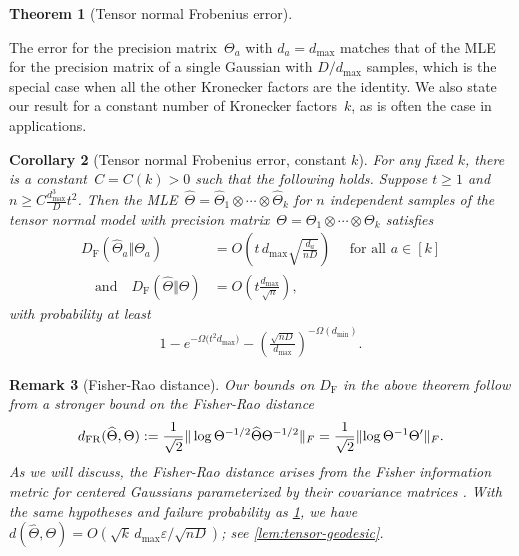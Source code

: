 \documentclass[aos]{imsart}
\newtheorem{theorem}{Theorem}[section]
\newtheorem{corollary}[theorem]{Corollary}
\newtheorem{remark*}[theorem]{Remark}
\theoremstyle{definition}
\numberwithin{equation}{section}
\DeclarePairedDelimiter{\norm}{\lVert}{\rVert}
\newcommand{\htheta}{\widehat{\Theta}}
\newcommand{\ot}{\otimes}
\newcommand{\eps}{\varepsilon}
\newcommand{\DF}{D_{\operatorname{F}}}
\newcommand{\dFR}{d_{\operatorname{FR}}}
\def\dmin{d_{\min}}
\def\dmax{d_{\max}}
\begin{document}
\begin{theorem}[Tensor normal Frobenius error]\label{thm:tensor-frobenius}
\end{theorem}

The error for the precision matrix~$\Theta_a$ with $d_a = \dmax$ matches that of the MLE for the precision matrix of a single Gaussian with $D/\dmax$ samples, which is the special case when all the other Kronecker factors are the identity.
We also state our result for a constant number of Kronecker factors~$k$, as is often the case in applications.

\begin{corollary}[Tensor normal Frobenius error, constant $k$]\label{cor:tensor-constant-k}
For any fixed $k$, there is a constant~$C = C(k)>0$ such that the following holds.
Suppose $t \geq 1$ and~$n \geq C \frac{\dmax^3}D t^2$.
Then the MLE~$\htheta = \htheta_1 \ot \cdots \ot \htheta_k$ for $n$ independent samples of the tensor normal model with precision matrix~$\Theta = \Theta_1 \ot \cdots \ot \Theta_k$ satisfies
\begin{align*}
  \DF(\htheta_a\Vert\Theta_a) &= O\left(t \, \dmax \sqrt{\frac{d_a}{n D}} \right) \quad\text{ for all } a\in[k] \\
\quad\text{and}\quad
  \DF(\htheta\Vert\Theta) &= O\left(t  \frac{\dmax}{\sqrt{n}}\right),
\end{align*}
with probability at least
\begin{align*}
  1 - e^{-\Omega\bigl( t^2 \dmax \bigr)} -  \left( \frac{\sqrt{nD}}{ \dmax} \right)^{-\Omega(\dmin)}.
\end{align*}
\end{corollary}


\begin{remark*}[Fisher-Rao distance]
Our bounds on $\DF$ in the above theorem follow from a stronger bound on the \emph{Fisher-Rao distance}
\begin{align}\label{eq:fisher rao}
  \dFR(\htheta, \Theta):= \frac{1}{\sqrt{2}}\|  \log \Theta^{-1/2} \htheta \Theta^{-1/2}\|_F = \frac1{\sqrt 2} \norm{\log \Theta^{-1} \Theta'}_F.
\end{align}
As we will discuss, the Fisher-Rao distance arises from the Fisher information metric for centered Gaussians parameterized by their covariance matrices \citep{skovgaard1984riemannian}.
With the same hypotheses and failure probability as \cref{thm:tensor-frobenius}, we have $d(\htheta, \Theta)  = O(\sqrt{k} \, \dmax \eps/\sqrt{nD})$; see \cref{lem:tensor-geodesic}.
\end{remark*}
\end{document}
